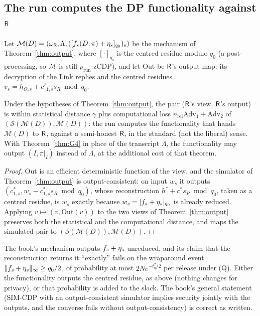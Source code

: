 \subsection{The run computes the DP functionality against $\mathsf{R}$}

Let $\mathcal M(D)=(\omega_{\mathsf{R}},\Lambda,([f_s(D;\pi)+\eta_s]_{q_0})_s)$ be the mechanism of Theorem~\ref{thm:output}, where $[\cdot]_{q_0}$ is the centred residue modulo $q_0$ (a post-processing, so $\mathcal M$ is still $\rho_{\mathrm{run}}$-zCDP), and let $\mathrm{Out}$ be $\mathsf{R}$'s output map: its decryption of the Link replies and the centred residues $v_s=h_{O,s}+c'_{1,s}s_R\bmod q_0$.

\begin{corollary}\label{cor:secureDP}
Under the hypotheses of Theorem~\ref{thm:output}, the pair ($\mathsf{R}$'s view, $\mathsf{R}$'s output) is within statistical distance $\gamma$ plus computational loss $n_{\mathrm{rel}}\mathrm{Adv}_1+\mathrm{Adv}_2$ of $(\mathcal S(\mathcal M(D)),\mathcal M(D))$: the run computes the functionality that hands $\mathcal M(D)$ to $\mathsf{R}$, against a semi-honest $\mathsf{R}$, in the standard (not the liberal) sense. With Theorem~\ref{thm:G4} in place of the transcript $\Lambda$, the functionality may output $(I,\pi|_I)$ instead of $\Lambda$, at the additional cost of that theorem.
\end{corollary}
\begin{proof}
$\mathrm{Out}$ is an efficient deterministic function of the view, and the simulator of Theorem~\ref{thm:output} is output-consistent: on input $w_s$ it outputs $(c^\ast_{1,s},w_s-c^\ast_{1,s}s_R\bmod q_0)$, whose reconstruction $h^\ast+c^\ast s_R\bmod q_0$, taken as a centred residue, is $w_s$ exactly because $w_s=[f_s+\eta_s]_{q_0}$ is already reduced. Applying $v\mapsto(v,\mathrm{Out}(v))$ to the two views of Theorem~\ref{thm:output} preserves both the statistical and the computational distance, and maps the simulated pair to $(\mathcal S(\mathcal M(D)),\mathcal M(D))$.
\end{proof}

\begin{remark}
The book's mechanism outputs $f_s+\eta_s$ unreduced, and its claim that the reconstruction returns it ``exactly'' fails on the wraparound event $\lVert f_s+\eta_s\rVert_\infty\ge q_0/2$, of probability at most $2Ne^{-t_\eta^2/2}$ per release under (Q). Either the functionality outputs the centred residue, as above (nothing changes for privacy), or that probability is added to the slack. The book's general statement (SIM-CDP with an output-consistent simulator implies security jointly with the outputs, and the converse fails without output-consistency) is correct as written.
\end{remark}

